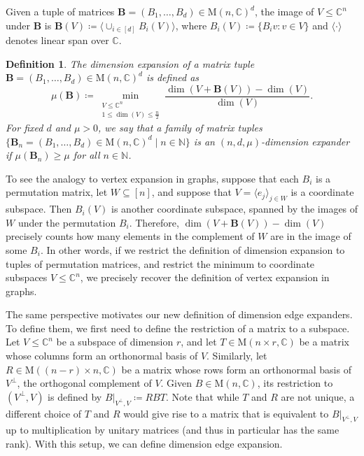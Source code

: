 \documentclass[11pt]{article}
\newtheorem{definition}[theorem]{Definition}
\newcommand{\N}{{\mathbb N}}
\theoremstyle{plain}
\numberwithin{equation}{section}
\theoremstyle{definition}
\newcommand{\bC}{\mathbb{C}}
\newcommand{\M}{\mathrm{M}}
\newcommand{\tuple}[1]{\mathbf{#1}}
\newcommand{\vB}{\tuple{B}}
\begin{document}
Given a tuple of matrices $\vB=(B_1, \dots, B_d)\in \M(n, 
\bC)^d$, the image of $V\leq\bC^n$ under $\vB$ is 
$\vB(V)\coloneqq \langle \cup_{i\in[d]}B_i(V)\rangle$, where $B_i(V) \coloneqq \{B_iv:v \in V\}$ and $\langle\cdot\rangle$ denotes 
linear span over $\bC$. 
\begin{definition}
The \emph{dimension expansion} of a matrix tuple $\vB=(B_1,\dots,B_d)\in \M(n,\bC)^d$ is defined as
\begin{equation}\label{eq: dimension expansion}
    \mu(\vB)\coloneqq \min_{\substack{V\leq \bC^n \\1\leq\dim(V)\leq \frac n2}}\frac{\dim(V+\vB(V))-\dim(V)}{\dim(V)}.
\end{equation}
For fixed $d$ and $\mu >0$, we say that a family of matrix tuples $\{\vB_n=(B_1, \dots, B_d)\in \M(n, \bC)^d\mid n\in \N\}$ is an \emph{$(n,d,\mu)$-dimension expander} if $\mu(\vB_n)\geq \mu$ for all $n\in\N$. 
\end{definition}
To see the analogy to vertex expansion in graphs, suppose that each $B_i$ is a permutation matrix, let $W \subseteq [n]$, and suppose that $V = \langle e_j\rangle_{j \in W}$ is a {coordinate subspace}. Then $B_i(V)$ is another coordinate subspace, spanned by the images of $W$ under the permutation $B_i$. Therefore, $\dim(V+\vB(V))-\dim(V)$ precisely counts how many elements in the complement of $W$ are in the image of some $B_i$. In other words, if we restrict the definition of dimension expansion to tuples of permutation matrices, and restrict the minimum to {coordinate subspaces} $V \leq \bC^n$, we precisely recover the definition of vertex expansion in graphs.

The same perspective motivates our new definition of dimension edge expanders. To define them, we first need to define the restriction of a matrix to a subspace.
Let $V \leq \bC^n$ be a subspace of dimension $r$, and let $T \in \M(n\times r,\bC)$ be a matrix whose columns form an orthonormal basis of $V$. Similarly, let $R \in \M( (n-r) \times n, \bC)$ be a matrix whose rows form an orthonormal basis of $V^\perp$,
the orthogonal complement of $V$. Given $B \in \M(n,\bC)$, its restriction to $(V^\perp, V)$ is defined by $B|_{V^\perp, V}\coloneqq RBT$.
Note that while $T$ and $R$ are not unique, a different choice of $T$ and $R$ would give rise to a matrix that is equivalent to $B|_{V^\perp, V}$ up to multiplication by unitary matrices (and thus in particular has the same rank).
With this setup, we can define dimension edge expansion.
\end{document}
